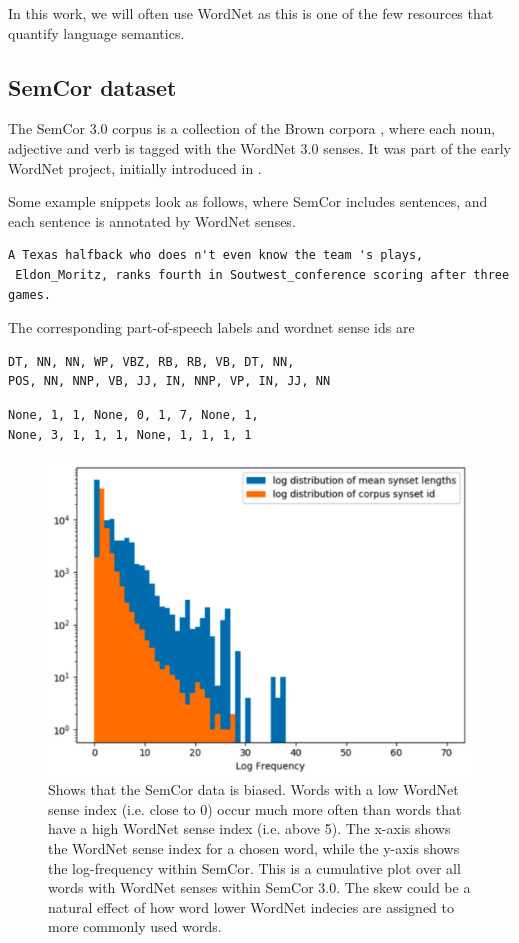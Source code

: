 \documentclass[a4paper,12pt,twoside,openright]{report}
\begin{document}
In this work, we will often use WordNet as this is one of the few resources that quantify language semantics.

\subsection{SemCor dataset}

The SemCor 3.0 corpus is a collection of the Brown corpora \cite{francis64}, where each noun, adjective and verb is tagged with the WordNet 3.0 senses.
It was part of the early WordNet project, initially introduced in \cite{miller94}.

Some example snippets look as follows, where SemCor includes sentences, and each sentence is annotated by WordNet senses.

\begin{verbatim}
A Texas halfback who does n't even know the team 's plays,
 Eldon_Moritz, ranks fourth in Soutwest_conference scoring after three games.
\end{verbatim}

The corresponding part-of-speech labels and wordnet sense ids 
are
\begin{verbatim}
DT, NN, NN, WP, VBZ, RB, RB, VB, DT, NN, 
POS, NN, NNP, VB, JJ, IN, NNP, VP, IN, JJ, NN
\end{verbatim}

\begin{verbatim}
None, 1, 1, None, 0, 1, 7, None, 1, 
None, 3, 1, 1, 1, None, 1, 1, 1, 1
\end{verbatim}


\begin{figure}[h]
	\center
  \includegraphics[width=0.6\linewidth]{./assets/background/semcor_skew.png}
  \caption{Shows that the SemCor data is biased. Words with a low WordNet sense index (i.e. close to 0) occur much more often than words that have a high WordNet sense index (i.e. above 5).
  The x-axis shows the WordNet sense index for a chosen word, while the y-axis shows the log-frequency within SemCor. 
  This is a cumulative plot over all words with WordNet senses within SemCor 3.0.
  The skew could be a natural effect of how word lower WordNet indecies are assigned to more commonly used words.
  }
  \label{fig:embeddings_by_language}
\end{figure}
\end{document}

